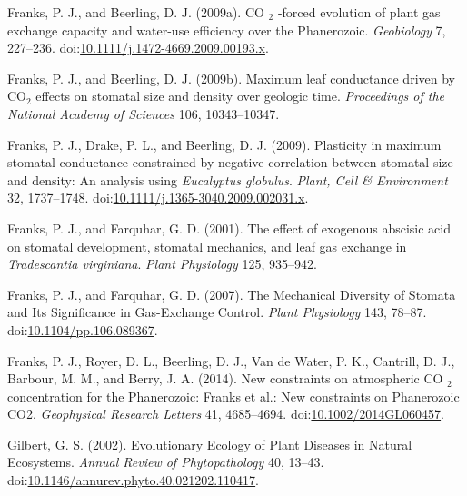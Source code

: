 \documentclass[utf8]{frontiersSCNS}
\newlength{\cslhangindent}
\newenvironment{cslreferences}%
  {\setlength{\parindent}{0pt}%
  \everypar{\setlength{\hangindent}{\cslhangindent}}\ignorespaces}%
  {\par}
\begin{document}
\begin{cslreferences}
\leavevmode\hypertarget{ref-franks_co_2009}{}%
Franks, P. J., and Beerling, D. J. (2009a). CO \(_{\textrm{2}}\) -forced
evolution of plant gas exchange capacity and water-use efficiency over
the Phanerozoic. \emph{Geobiology} 7, 227--236.
doi:\href{https://doi.org/10.1111/j.1472-4669.2009.00193.x}{10.1111/j.1472-4669.2009.00193.x}.

\leavevmode\hypertarget{ref-franks_maximum_2009}{}%
Franks, P. J., and Beerling, D. J. (2009b). Maximum leaf conductance
driven by CO\(_{\textrm{2}}\) effects on stomatal size and density over
geologic time. \emph{Proceedings of the National Academy of Sciences}
106, 10343--10347.

\leavevmode\hypertarget{ref-franks_plasticity_2009}{}%
Franks, P. J., Drake, P. L., and Beerling, D. J. (2009). Plasticity in
maximum stomatal conductance constrained by negative correlation between
stomatal size and density: An analysis using \emph{Eucalyptus globulus}.
\emph{Plant, Cell \& Environment} 32, 1737--1748.
doi:\href{https://doi.org/10.1111/j.1365-3040.2009.002031.x}{10.1111/j.1365-3040.2009.002031.x}.

\leavevmode\hypertarget{ref-franks_effect_2001}{}%
Franks, P. J., and Farquhar, G. D. (2001). The effect of exogenous
abscisic acid on stomatal development, stomatal mechanics, and leaf gas
exchange in \emph{Tradescantia virginiana}. \emph{Plant Physiology} 125,
935--942.

\leavevmode\hypertarget{ref-franks_mechanical_2007}{}%
Franks, P. J., and Farquhar, G. D. (2007). The Mechanical Diversity of
Stomata and Its Significance in Gas-Exchange Control. \emph{Plant
Physiology} 143, 78--87.
doi:\href{https://doi.org/10.1104/pp.106.089367}{10.1104/pp.106.089367}.

\leavevmode\hypertarget{ref-franks_new_2014}{}%
Franks, P. J., Royer, D. L., Beerling, D. J., Van de Water, P. K.,
Cantrill, D. J., Barbour, M. M., and Berry, J. A. (2014). New
constraints on atmospheric CO \(_{\textrm{2}}\) concentration for the
Phanerozoic: Franks et al.: New constraints on Phanerozoic CO2.
\emph{Geophysical Research Letters} 41, 4685--4694.
doi:\href{https://doi.org/10.1002/2014GL060457}{10.1002/2014GL060457}.

\leavevmode\hypertarget{ref-gilbert_evolutionary_2002}{}%
Gilbert, G. S. (2002). Evolutionary Ecology of Plant Diseases in Natural
Ecosystems. \emph{Annual Review of Phytopathology} 40, 13--43.
doi:\href{https://doi.org/10.1146/annurev.phyto.40.021202.110417}{10.1146/annurev.phyto.40.021202.110417}.


\end{cslreferences}
\end{document}
